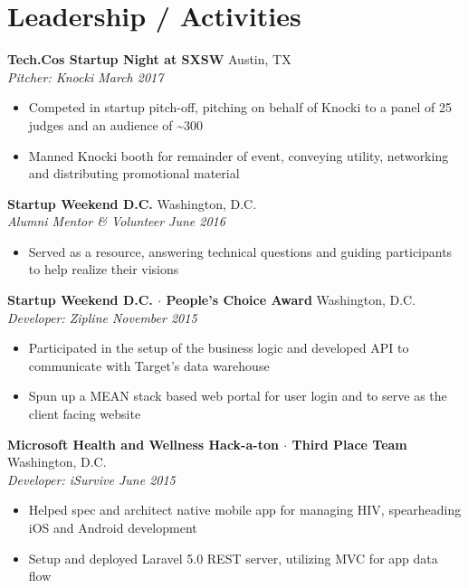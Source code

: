 \documentclass[10pt]{article}
\begin{document}
\section*{Leadership / Activities}
\textbf{Tech.Co\textquotesingle{}s Startup Night at SXSW} \hfill Austin, TX\\
\textit{Pitcher: Knocki \hfill March 2017} \\
\vspace{-1.1em}
\begin{itemize}
  \item Competed in startup pitch-off, pitching on behalf of Knocki to a panel of 25 judges and an audience of {\textasciitilde{}}300
  \item Manned Knocki booth for remainder of event, conveying utility, networking and distributing promotional material
\end{itemize}
\textbf{Startup Weekend D.C.} \hfill Washington, D.C. \\
\textit{Alumni Mentor \& Volunteer \hfill June 2016} \\
\vspace{-1.1em}
\begin{itemize}
  \item Served as a resource, answering technical questions and guiding participants to help realize their visions
\end{itemize}
\textbf{Startup Weekend D.C. $\cdot$ People's Choice Award} \hfill Washington, D.C. \\
\textit{Developer: Zipline \hfill November 2015} \\
\vspace{-1.1em}
\begin{itemize}
  \item Participated in the setup of the business logic and developed API to communicate with Target's data warehouse
  \item Spun up a MEAN stack based web portal for user login and to serve as the client facing website
\end{itemize}
\textbf{Microsoft Health and Wellness Hack-a-ton $\cdot$ Third Place Team} \hfill Washington, D.C. \\
\textit{Developer: iSurvive \hfill June 2015} \\
\vspace{-1.1em}
\begin{itemize}
  \item Helped spec and architect native mobile app for managing HIV, spearheading iOS and Android development
  \item Setup and deployed Laravel 5.0 REST server, utilizing MVC for app data flow
\end{itemize}
\end{document}
